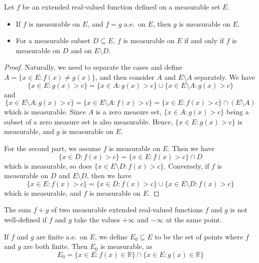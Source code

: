 \documentclass[../main.tex]{subfiles}
\begin{document}
\begin{proposition}{}{}
	Let $f$ be an extended real-valued function defined on a measurable set $E$.
	\begin{itemize}
		\item If $f$ is measurable on $E$, and $f = g$ a.e.\ on $E$, then $g$ is measurable on $E$.
		\item For a measurable subset $D \subseteq E$, $f$ is measurable on $E$ if and only if $f$ is measurable on $D$ and on $E \setminus D$.
	\end{itemize}
\end{proposition}
\begin{proof}
	Naturally, we need to separate the cases and define $A = \{x \in E : f(x) \neq g(x)\}$, and then consider $A$ and $E \setminus A$ separately. We have
	\begin{equation*}
		\{x \in E : g(x) > c\} = \{x \in A : g(x) > c\} \cup \{x \in E \setminus A : g(x) > c\}
	\end{equation*}
	and
	\begin{equation*}
		\{x \in E\setminus A : g(x) > c\} = \{x \in E \setminus A : f(x) > c\} = \{x \in E : f(x) > c\} \cap (E \setminus A)
	\end{equation*}
	which is measurable. Since $A$ is a zero measure set, $\{x \in A : g(x) > c\}$ being a subset of a zero measure set is also measurable. Hence, $\{x \in E : g(x) > c\}$ is measurable, and $g$ is measurable on $E$.

	For the second part, we assume $f$ is measurable on $E$. Then we have
	\begin{equation*}
		\{x \in D : f(x) > c\} = \{x \in E : f(x) > c\} \cap D
	\end{equation*}
	which is measurable, so does $\{x \in E \setminus D : f(x) > c\}$. Conversely, if $f$ is measurable on $D$ and $E \setminus D$, then we have
	\begin{equation*}
		\{x \in E : f(x) > c\} = \{x \in D : f(x) > c\} \cup \{x \in E \setminus D : f(x) > c\}
	\end{equation*}
	which is measurable, and $f$ is measurable on $E$.
\end{proof}

The sum $f+g$ of two measurable extended real-valued functions $f$ and $g$ is not well-defined if $f$ and $g$ take the values $+\infty$ and $-\infty$ at the same point.

If $f$ and $g$ are finite a.e.\ on $E$, we define $E_0 \subseteq E$ to be the set of points where $f$ and $g$ are both finite. Then $E_0$ is measurable, as
\begin{equation*}
	E_0 = \{x \in E : f(x) \in \mathbb{R}\} \cap \{x \in E : g(x) \in \mathbb{R}\}
\end{equation*}
\end{document}
